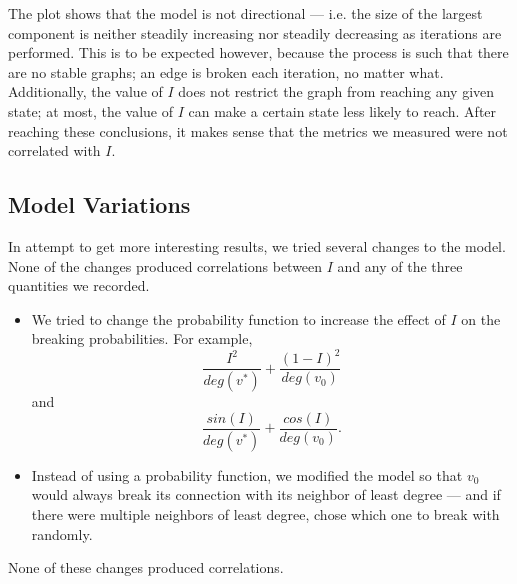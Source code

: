 \documentclass[a4paper,10pt]{article}
\begin{document}
The plot shows that the model is not directional --- i.e. the size of the largest component is neither steadily increasing nor steadily decreasing as iterations are performed. This is to be expected however, because the process is such that there are no stable graphs; an edge is broken each iteration, no matter what. Additionally, the value of $I$ does not restrict the graph from reaching any given state; at most, the value of $I$ can make a certain state less likely to reach. After reaching these conclusions, it makes sense that the metrics we measured were not correlated with $I$.
\subsection{Model Variations}
In attempt to get more interesting results, we tried several changes to the model. None of the changes produced correlations between $I$ and any of the three quantities we recorded.

\begin{itemize}

 \item We tried to change the probability function to increase the effect of $I$ on the breaking probabilities. For example,
 \begin{equation}
  \frac{I^2}{deg(v^*)} + \frac{(1 - I)^2}{deg(v_0)}
 \end{equation}
and
 \begin{equation}
  \frac{sin(I)}{deg(v^*)} + \frac{cos(I)}{deg(v_0)}.
 \end{equation}

 \item Instead of using a probability function, we modified the model so that $v_0$ would always break its connection with its neighbor of least degree --- and if there were multiple neighbors of least degree, chose which one to break with randomly. 

\end{itemize}
 None of these changes produced correlations.
\end{document}
